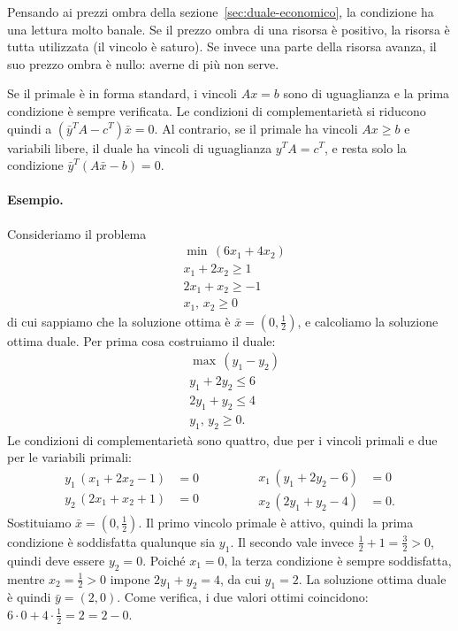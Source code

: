 Pensando ai prezzi ombra della sezione~\ref{sec:duale-economico}, la condizione ha una lettura molto banale. Se il prezzo ombra di una risorsa è positivo, la risorsa è tutta utilizzata (il vincolo è saturo). Se invece una parte della risorsa avanza, il suo prezzo ombra è nullo: averne di più non serve.

\begin{osservazione}
Se il primale è in forma standard, i vincoli $Ax = b$ sono di uguaglianza e la prima condizione è sempre verificata. Le condizioni di complementarietà si riducono quindi a $(\bar{y}^T A - c^T)\bar{x} = 0$. Al contrario, se il primale ha vincoli $Ax \ge b$ e variabili libere, il duale ha vincoli di uguaglianza $y^T A = c^T$, e resta solo la condizione $\bar{y}^T(A\bar{x} - b) = 0$.
\end{osservazione}

\paragraph{Esempio.}
Consideriamo il problema
\[
\begin{aligned}
&\min\, (6x_1 + 4x_2) \\
&x_1 + 2x_2 \ge 1 \\
&2x_1 + x_2 \ge -1 \\
&x_1,\, x_2 \ge 0
\end{aligned}
\]
di cui sappiamo che la soluzione ottima è $\bar{x} = (0, \frac12)$, e calcoliamo la soluzione ottima duale. Per prima cosa costruiamo il duale:
\[
\begin{aligned}
&\max\, (y_1 - y_2) \\
&y_1 + 2y_2 \le 6 \\
&2y_1 + y_2 \le 4 \\
&y_1,\, y_2 \ge 0.
\end{aligned}
\]
Le condizioni di complementarietà sono quattro, due per i vincoli primali e due per le variabili primali:
\[
\begin{aligned}
y_1\,(x_1 + 2x_2 - 1) &= 0 \\
y_2\,(2x_1 + x_2 + 1) &= 0
\end{aligned}
\qquad\qquad
\begin{aligned}
x_1\,(y_1 + 2y_2 - 6) &= 0 \\
x_2\,(2y_1 + y_2 - 4) &= 0.
\end{aligned}
\]
Sostituiamo $\bar{x} = (0, \frac12)$. Il primo vincolo primale è attivo, quindi la prima condizione è soddisfatta qualunque sia $y_1$. Il secondo vale invece $\frac12 + 1 = \frac32 > 0$, quindi deve essere $y_2 = 0$. Poiché $x_1 = 0$, la terza condizione è sempre soddisfatta, mentre $x_2 = \frac12 > 0$ impone $2y_1 + y_2 = 4$, da cui $y_1 = 2$. La soluzione ottima duale è quindi $\bar{y} = (2, 0)$. Come verifica, i due valori ottimi coincidono: $6 \cdot 0 + 4 \cdot \frac12 = 2 = 2 - 0$.

